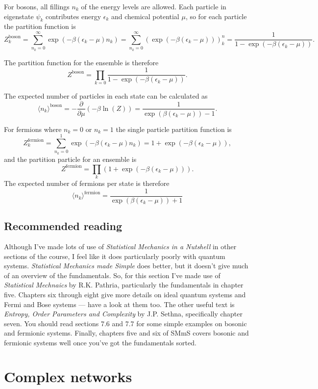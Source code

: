 \documentclass{article}
\begin{document}
For bosons, all fillings $n_k$ of the energy levels are allowed. Each particle in eigenstate $\psi_k$ contributes energy $\epsilon_k$ and chemical potential $\mu$, so for each particle the partition function is
$$
	Z_k^\text{boson} = \sum_{n_k=0}^\infty\exp(-\beta(\epsilon_k-\mu)n_k) = \sum_{n_k=0}^\infty\left(\exp(-\beta(\epsilon_k-\mu))\right)^n_k = \frac{1}{1-\exp(-\beta(\epsilon_k-\mu))}.
$$

The partition function for the ensemble is therefore
$$
	Z^\text{boson} = \prod_{k=0} \frac{1}{1-\exp(-\beta(\epsilon_k-\mu))}.
$$

The expected number of particles in each state can be calculated as
$$
	\langle n_k \rangle^\text{boson} = -\frac{\partial}{\partial \mu}(-\beta\ln(Z)) = \frac{1}{\exp(\beta(\epsilon_k-\mu))-1}.
$$


For fermions where $n_k=0$ or $n_k=1$ the single particle partition function is
$$
	Z_k^\text{fermion} = \sum_{n_k=0}^1 \exp(-\beta(\epsilon_k-\mu)n_k) = 1 + \exp(-\beta(\epsilon_k-\mu)),
$$
and the partition particle for an ensemble is
$$
	Z^\text{fermion} = \prod_k(1+ \exp(-\beta(\epsilon_k-\mu))).
$$
The expected number of fermions per state is therefore
$$
		\langle n_k \rangle^\text{fermion} = \frac{1}{\exp(\beta(\epsilon_k-\mu))+1}
$$
\subsection*{Recommended reading}
Although I've made lots of use of \emph{Statistical Mechanics in a Nutshell} in other sections of the course, I feel like it does particularly poorly with quantum systems. \emph{Statistical Mechanics made Simple} does better, but it doesn't give much of an overview of the fundamentals. So, for this section I've made use of \emph{Statistical Mechnaics} by R.K. Pathria, particularly the fundamentals in chapter five. Chapters six through eight give more details on ideal quantum systems and Fermi and Bose systems --- have a look at them too. The other useful text is \emph{Entropy, Order Parameters and Complexity} by J.P. Sethna, specifically chapter seven.  You should read sections 7.6 and 7.7 for some simple examples on bosonic and fermionic systems. Finally, chapters five and six of SMmS covers bosonic and fermionic systems well once you've got the fundamentals sorted.


\section*{Complex networks}
\end{document}
